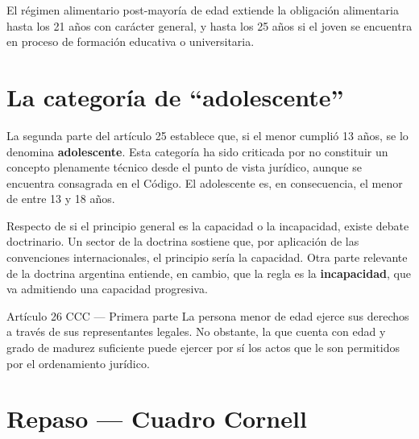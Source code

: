 \documentclass[12pt,oneside]{book}
\begin{document}
\begin{note}
El régimen alimentario post-mayoría de edad extiende la obligación alimentaria hasta los 21 años con carácter general, y hasta los 25 años si el joven se encuentra en proceso de formación educativa o universitaria.
\end{note}

\section{La categoría de \textquotedblleft adolescente\textquotedblright}

La segunda parte del artículo 25 establece que, si el menor cumplió 13 años, se lo denomina \textbf{adolescente}. Esta categoría ha sido criticada por no constituir un concepto plenamente técnico desde el punto de vista jurídico, aunque se encuentra consagrada en el Código. El adolescente es, en consecuencia, el menor de entre 13 y 18 años.

Respecto de si el principio general es la capacidad o la incapacidad, existe debate doctrinario. Un sector de la doctrina sostiene que, por aplicación de las convenciones internacionales, el principio sería la capacidad. Otra parte relevante de la doctrina argentina entiende, en cambio, que la regla es la \textbf{incapacidad}, que va admitiendo una capacidad progresiva.

\begin{definition}{Artículo 26 CCC — Primera parte}
La persona menor de edad ejerce sus derechos a través de sus representantes legales. No obstante, la que cuenta con edad y grado de madurez suficiente puede ejercer por sí los actos que le son permitidos por el ordenamiento jurídico.
\end{definition}

\section*{Repaso — Cuadro Cornell}
\end{document}
